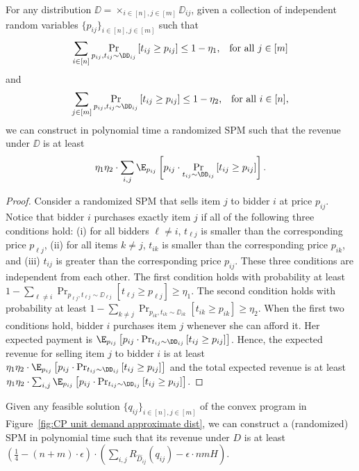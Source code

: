\begin{lemma}\label{lem:prices to SPM}
	 For any distribution $\DD=\times_{i\in[n], j\in[m]}\DD_{ij}$, given a collection of independent random variables $\{p_{ij}\}_{i\in[n],j\in[m]}$ such that $$\sum_{i\in[n]} \Pr_{p_{ij}, t_{ij}\sim \DD_{ij}}\left[t_{ij}\geq p_{ij}\right]\leq 1-\eta_1 \text{,\quad for all $j\in[m]$}$$ and $$\sum_{j\in[m]} \Pr_{p_{ij}, t_{ij}\sim \DD_{ij}}\left[t_{ij}\geq p_{ij}\right]\leq 1-\eta_2 \text{,\quad for all $i\in[n]$},$$ we can construct in polynomial time a randomized SPM such that the revenue under $\DD$ is at least $$\eta_1 \eta_2\cdot \sum_{i, j} \E_{p_{ij}}\left[p_{ij}\cdot \Pr_{t_{ij}\sim \DD_{ij}}\left[t_{ij}\geq p_{ij}\right]\right].$$
	 \end{lemma}

\begin{proof}
	Consider a randomized SPM that sells item $j$ to bidder $i$ at price $p_{ij}$. Notice that bidder $i$ purchases exactly item $j$ if all of the following three conditions hold: (i) for all bidders $\ell\neq i$, $t_{\ell j}$ is smaller than the corresponding price $p_{\ell j}$,  (ii) for all items $k\neq j$, $t_{ik}$ is smaller than the corresponding price $p_{ik}$, and (iii) $t_{ij}$ is greater than the corresponding price $p_{ij}$. These three conditions are independent from each other. The first condition holds with probability at least $1-\sum_{\ell\neq i} \Pr_{p_{\ell j}, t_{\ell j}\sim \DD_{\ell j}}\left[t_{\ell j}\geq p_{\ell j}\right]\geq \eta_1$. The second condition holds with probability at least $1-\sum_{k \neq j} \Pr_{p_{ik}, t_{ik}\sim \DD_{ik}}\left[t_{ik}\geq p_{ik}\right]\geq \eta_2$. When the first two conditions hold, bidder $i$ purchases item $j$ whenever she can afford it. Her expected payment is $\E_{p_{ij}}\left[p_{ij}\cdot \Pr_{t_{ij}\sim \DD_{ij}}\left[t_{ij}\geq p_{ij}\right]\right]$. Hence, the expected revenue for selling item $j$ to bidder $i$ is at least $\eta_1\eta_2\cdot \E_{p_{ij}}\left[p_{ij}\cdot \Pr_{t_{ij}\sim \DD_{ij}}\left[t_{ij}\geq p_{ij}\right]\right]$ and the total expected revenue is at least $\eta_1 \eta_2\cdot \sum_{i, j} \E_{p_{ij}}\left[p_{ij}\cdot \Pr_{t_{ij}\sim \DD_{ij}}\left[t_{ij}\geq p_{ij}\right]\right]$.
	
	\end{proof}

\begin{lemma}\label{lem:convert approx CP to SPM}
	Given any feasible solution $\{{q}_{ij}\}_{i\in[n],j\in[m]}$ of the convex program in Figure~\ref{fig:CP unit demand approximate dist}, we can construct a (randomized) SPM in polynomial time such that its revenue under $D$ is at least $\left(\frac{1}{4}-(n+m)\cdot \epsilon\right)\cdot \left( \sum_{i,j}R_{\hat{D}_{ij}}(q_{ij})-\epsilon\cdot nmH\right)$. 
\end{lemma}

